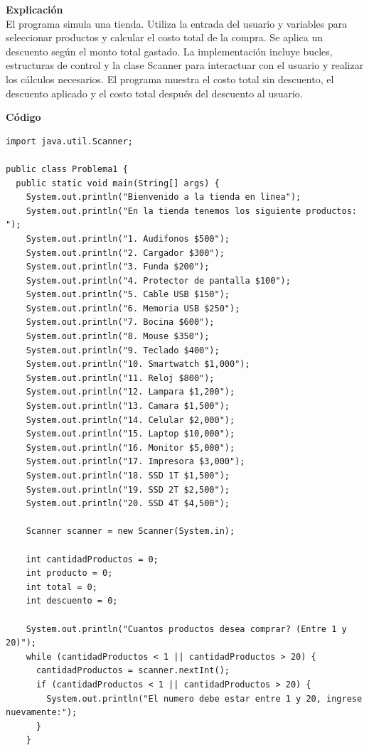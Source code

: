 \documentclass[11pt, twocolumn]{article}
\begin{document}
  \textbf{Explicación} \\
  El programa simula una tienda. Utiliza la entrada del usuario y variables para seleccionar productos y calcular el costo total de la compra. Se aplica un descuento según el monto total gastado. La implementación incluye bucles, estructuras de control y la clase Scanner para interactuar con el usuario y realizar los cálculos necesarios. El programa muestra el costo total sin descuento, el descuento aplicado y el costo total después del descuento al usuario.

  \textbf{Código}
  \begin{lstlisting}
import java.util.Scanner;

public class Problema1 {
  public static void main(String[] args) {
    System.out.println("Bienvenido a la tienda en linea");
    System.out.println("En la tienda tenemos los siguiente productos: ");
    System.out.println("1. Audifonos $500");
    System.out.println("2. Cargador $300");
    System.out.println("3. Funda $200");
    System.out.println("4. Protector de pantalla $100");
    System.out.println("5. Cable USB $150");
    System.out.println("6. Memoria USB $250");
    System.out.println("7. Bocina $600");
    System.out.println("8. Mouse $350");
    System.out.println("9. Teclado $400");
    System.out.println("10. Smartwatch $1,000");
    System.out.println("11. Reloj $800");
    System.out.println("12. Lampara $1,200");
    System.out.println("13. Camara $1,500");
    System.out.println("14. Celular $2,000");
    System.out.println("15. Laptop $10,000");
    System.out.println("16. Monitor $5,000");
    System.out.println("17. Impresora $3,000");
    System.out.println("18. SSD 1T $1,500");
    System.out.println("19. SSD 2T $2,500");
    System.out.println("20. SSD 4T $4,500");

    Scanner scanner = new Scanner(System.in);

    int cantidadProductos = 0;
    int producto = 0;
    int total = 0;
    int descuento = 0;

    System.out.println("Cuantos productos desea comprar? (Entre 1 y 20)");
    while (cantidadProductos < 1 || cantidadProductos > 20) {
      cantidadProductos = scanner.nextInt();
      if (cantidadProductos < 1 || cantidadProductos > 20) {
        System.out.println("El numero debe estar entre 1 y 20, ingrese nuevamente:");
      }
    }


\end{lstlisting}
\end{document}
